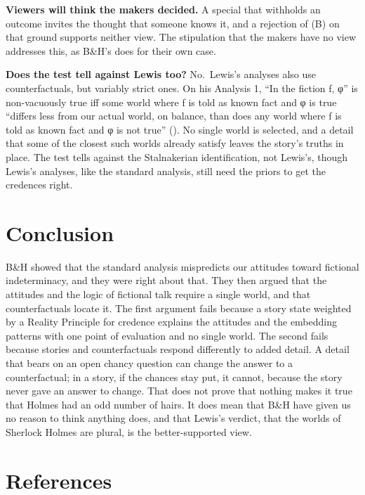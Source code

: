 \documentclass[
  11pt,
  letterpaper,
  DIV=11,
  numbers=noendperiod,
  twoside]{scrartcl}
\begin{document}
\textbf{Viewers will think the makers decided.} A special that withholds
an outcome invites the thought that someone knows it, and a rejection of
(B) on that ground supports neither view. The stipulation that the
makers have no view addresses this, as B\&H's does for their own case.

\textbf{Does the test tell against Lewis too?} No.~Lewis's analyses also
use counterfactuals, but variably strict ones. On his Analysis 1, ``In
the fiction f, φ'' is non-vacuously true iff some world where f is told
as known fact and φ is true ``differs less from our actual world, on
balance, than does any world where f is told as known fact and φ is not
true'' (). No single world is
selected, and a detail that some of the closest such worlds already
satisfy leaves the story's truths in place. The test tells against the
Stalnakerian identification, not Lewis's, though Lewis's analyses, like
the standard analysis, still need the priors to get the credences right.

\section{Conclusion}\label{sec-conclusion}

B\&H showed that the standard analysis mispredicts our attitudes toward
fictional indeterminacy, and they were right about that. They then
argued that the attitudes and the logic of fictional talk require a
single world, and that counterfactuals locate it. The first argument
fails because a story state weighted by a Reality Principle for credence
explains the attitudes and the embedding patterns with one point of
evaluation and no single world. The second fails because stories and
counterfactuals respond differently to added detail. A detail that bears
on an open chancy question can change the answer to a counterfactual; in
a story, if the chances stay put, it cannot, because the story never
gave an answer to change. That does not prove that nothing makes it true
that Holmes had an odd number of hairs. It does mean that B\&H have
given us no reason to think anything does, and that Lewis's verdict,
that the worlds of Sherlock Holmes are plural, is the better-supported
view.

\section*{References}\label{references}
\end{document}
